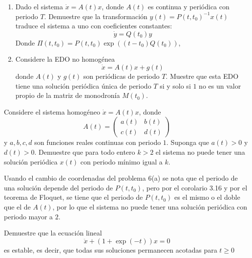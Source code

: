 \documentclass{homework}
\begin{document}
\begin{sol}
    
\end{sol}

\begin{prob}
    \begin{enumerate}[label=(\alph*)]
        \item Dado el sistema \(\dot{x}=A(t)x\), donde \(A(t)\) es continua y periódica con periodo \(T\). Demuestre que la transformación \(y(t)=P(t,t_0)^{-1}x(t)\) traduce el sistema a uno con coeficientes constantes:
        \[\dot{y}=Q(t_0)y\]
        Donde \(\Pi(t,t_0)=P(t,t_0)\exp((t-t_0)Q(t_0))\), 
        \item Considere la EDO no homogénea
        \[\dot{x}=A(t)x+g(t)\]
        donde \(A(t)\) y \(g(t)\) son periódicas de periodo \(T\). Muestre que esta EDO tiene una solución periódica única de periodo \(T\) si y solo si \(1\) no es un valor propio de la matriz de monodronía \(M(t_0)\).
    \end{enumerate}
\end{prob}

\begin{sol}
    
\end{sol}

\begin{prob}
    Considere el sistema homogéneo \(\dot{x}=A(t)x\), donde
    \[A(t)=\begin{pmatrix}
        a(t)&b(t)\\c(t)&d(t)
    \end{pmatrix}\]
    y \(a,b,c,d\) son funciones reales continuas con periodo \(1\). Suponga que \(a(t)>0\) y \(d(t)>0\). Demuestre que para todo entero \(k>2\) el sistema no puede tener una solución periódica \(x(t)\) con periodo mínimo igual a \(k\).
\end{prob}

\begin{sol}
    Usando el cambio de coordenadas del problema 6(a) se nota que el periodo de una solución depende del periodo de \(P(t,t_0)\), pero por el corolario 3.16 y por el teorema de Floquet, se tiene que el periodo de \(P(t,t_0)\) es el mismo o el doble que el de \(A(t)\), por lo que el sistema no puede tener una solución periódica con periodo mayor a \(2\).
\end{sol}

\begin{prob}
    Demuestre que la ecuación lineal
    \[\ddot{x}+(1+\exp(-t))x=0\]
    es estable, es decir, que todas sus soluciones permanecen acotadas para \(t\geq0\)
\end{prob}
\end{document}
